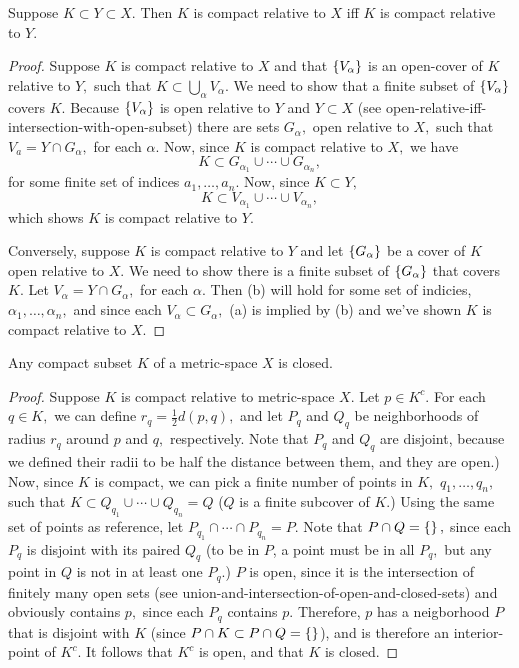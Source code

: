 \documentclass{article}
\begin{document}
\begin{theorem}\label{compact-relative-to-subspace}
Suppose $K \subset Y \subset X.$ Then $K$ is \@{compact} relative to $X$ iff $K$ is compact relative to $Y.$
\end{theorem}
\begin{proof}
Suppose $K$ is \@{compact} relative to $X$ and that $\left\{ V_\alpha \right\}$ is an \@{open-cover} of $K$ relative to $Y,$ such that $K \subset \bigcup_\alpha V_\alpha.$ We need to show that a finite subset of $\left\{ V_\alpha \right\}$ covers $K.$  Because $\left\{ V_\alpha \right\}$ is open relative to $Y$ and $Y \subset X$ (see \@{open-relative-iff-intersection-with-open-subset}) there are sets $G_\alpha,$ open relative to $X,$ such that $V_a = Y \cap G_\alpha,$ for each $\alpha.$ Now, since $K$ is compact relative to $X,$ we have
\[ K \subset G_{\alpha_1} \cup \cdots \cup G_{\alpha_n}, \tag{a} \]
for some finite set of indices $a_1, \dots, a_n.$ Now, since $K \subset Y,$
\[ K \subset V_{\alpha_1} \cup \cdots \cup V_{\alpha_n}, \tag{b} \]
which shows $K$ is compact relative to $Y.$

Conversely, suppose $K$ is compact relative to $Y$ and let $\left\{ G_\alpha \right\}$ be a cover of $K$ open relative to $X.$ We need to show there is a finite subset of $\left\{ G_\alpha \right\}$ that covers $K.$ Let $V_\alpha = Y \cap G_\alpha,$ for each $\alpha.$ Then (b) will hold for some set of indicies, $\alpha_1, \dots, \alpha_n,$ and since each $V_\alpha \subset G_\alpha,$ (a) is implied by (b) and we've shown $K$ is compact relative to $X.$
\end{proof}

\begin{theorem}\label{compact-implies-closed}
Any \@{compact} subset $K$ of a \@{metric-space} $X$ is \@{closed}.
\end{theorem}
\begin{proof}
Suppose $K$ is \@{compact} relative to \@{metric-space} $X.$ Let $p \in K^c.$ For each $q \in K,$ we can define $r_q = \frac{1}{2} d(p,q),$ and let $P_q$ and $Q_q$ be \@{neighborhoods} of radius $r_q$ around $p$ and $q,$ respectively. Note that $P_q$ and $Q_q$ are disjoint, because we defined their radii to be half the distance between them, and they are \@{open}.) Now, since $K$ is compact, we can pick a finite number of points in $K,$ $q_1, \dots, q_n,$ such that $K \subset Q_{q_1} \cup \cdots \cup Q_{q_n} = Q$ ($Q$ is a finite subcover of $K.$) Using the same set of points as reference, let $P_{q_1} \cap \cdots \cap P_{q_n} = P.$ Note that $P \cap Q = \left\{  \right\},$ since each $P_q$ is disjoint with its paired $Q_q$ (to be in $P$, a point must be in all $P_q,$ but any point in $Q$ is not in at least one $P_q.$) $P$ is open, since it is the intersection of finitely many open sets (see \@{union-and-intersection-of-open-and-closed-sets}) and obviously contains $p,$ since each $P_q$ contains $p$. Therefore, $p$ has a neigborhood $P$ that is disjoint with $K$ (since $P \cap K \subset P \cap Q = \left\{  \right\}$), and is therefore an \@{interior-point} of $K^c.$ It follows that $K^c$ is open, and that $K$ is \@{closed}.
\end{proof}
\end{document}
